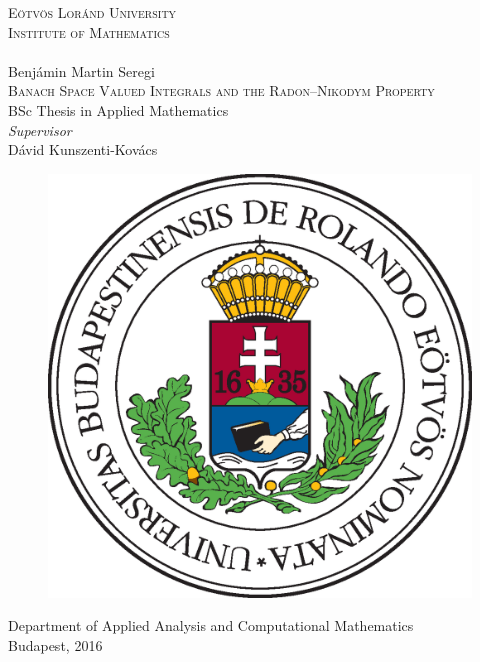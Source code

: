 \documentclass[a4paper, 12pt]{article}
\begin{document}
\thispagestyle{empty}
\begin{center}\renewcommand\baselinestretch{0.9}
{\Large \textsc{Eötvös Loránd University}\\\textsc{Institute of Mathematics}\\} \hrulefill
\vspace{1.0cm} {\huge \\ Benjámin Martin Seregi \\} \vspace{1cm}
{\Huge\textsc{Banach Space Valued Integrals and the Radon\---Nikodym Property}\\ \vspace{0.5cm}}
{\large\textsc BSc Thesis in Applied Mathematics}\\ \vspace{1cm}
{\large \textit{Supervisor}\\
\vspace{0.2cm}
Dávid Kunszenti-Kovács\vspace{1.2cm}}\\
\begin{figure}[!h]
\begin{center}
\resizebox{8.5cm}{!}
{\includegraphics{elte_cimer_szines}}
\end{center}
\end{figure}
{\large  Department of Applied Analysis and Computational Mathematics \\ \vspace{0.5cm}
Budapest, 2016}
\end{center}
\end{document}

